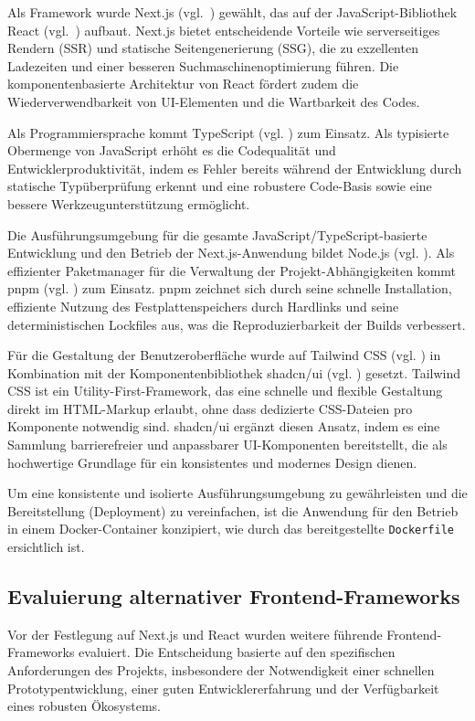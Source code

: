 Als Framework wurde Next.js (vgl.~\cite{nextjs}) gewählt, das auf der JavaScript-Bibliothek React (vgl.~\cite{react}) aufbaut. Next.js bietet entscheidende Vorteile wie serverseitiges Rendern (SSR) und statische Seitengenerierung (SSG), die zu exzellenten Ladezeiten und einer besseren Suchmaschinenoptimierung führen. Die komponentenbasierte Architektur von React fördert zudem die Wiederverwendbarkeit von UI-Elementen und die Wartbarkeit des Codes.

Als Programmiersprache kommt TypeScript (vgl. \cite{typescript}) zum Einsatz. Als typisierte Obermenge von JavaScript erhöht es die Codequalität und Entwicklerproduktivität, indem es Fehler bereits während der Entwicklung durch statische Typüberprüfung erkennt und eine robustere Code-Basis sowie eine bessere Werkzeugunterstützung ermöglicht.

Die Ausführungsumgebung für die gesamte JavaScript/TypeScript-basierte Entwicklung und den Betrieb der Next.js-Anwendung bildet Node.js (vgl. \cite{nodejs}). Als effizienter Paketmanager für die Verwaltung der Projekt-Abhängigkeiten kommt pnpm (vgl. \cite{pnpm}) zum Einsatz. pnpm zeichnet sich durch seine schnelle Installation, effiziente Nutzung des Festplattenspeichers durch Hardlinks und seine deterministischen Lockfiles aus, was die Reproduzierbarkeit der Builds verbessert.

Für die Gestaltung der Benutzeroberfläche wurde auf Tailwind CSS (vgl. \cite{tailwindcss}) in Kombination mit der Komponentenbibliothek shadcn/ui (vgl. \cite{shadcnui}) gesetzt. Tailwind CSS ist ein Utility-First-Framework, das eine schnelle und flexible Gestaltung direkt im HTML-Markup erlaubt, ohne dass dedizierte CSS-Dateien pro Komponente notwendig sind. shadcn/ui ergänzt diesen Ansatz, indem es eine Sammlung barrierefreier und anpassbarer UI-Komponenten bereitstellt, die als hochwertige Grundlage für ein konsistentes und modernes Design dienen.

Um eine konsistente und isolierte Ausführungsumgebung zu gewährleisten und die Bereitstellung (Deployment) zu vereinfachen, ist die Anwendung für den Betrieb in einem Docker-Container konzipiert, wie durch das bereitgestellte \texttt{Dockerfile} ersichtlich ist.

\subsection{Evaluierung alternativer Frontend-Frameworks}

Vor der Festlegung auf Next.js und React wurden weitere führende Frontend-Frameworks evaluiert. Die Entscheidung basierte auf den spezifischen Anforderungen des Projekts, insbesondere der Notwendigkeit einer schnellen Prototypentwicklung, einer guten Entwicklererfahrung und der Verfügbarkeit eines robusten Ökosystems.

